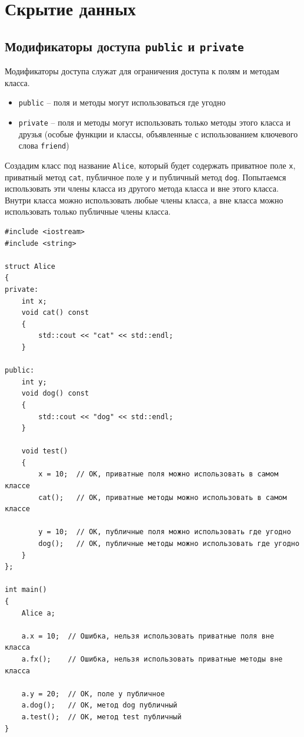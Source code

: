 \documentclass{article}
\begin{document}
\newpage


\section*{Скрытие данных}
\subsection*{Модификаторы доступа \texttt{public} и \texttt{private}}
Модификаторы доступа служат для ограничения доступа к полям и методам класса.
\begin{itemize}
\item \texttt{public} -- поля и методы могут использоваться где угодно
\item \texttt{private} -- поля и методы могут использовать только методы этого класса и друзья (особые функции и классы, объявленные с использованием ключевого слова \texttt{friend})
\end{itemize}
Создадим класс под название \texttt{Alice}, который будет содержать приватное поле \texttt{x}, приватный метод \texttt{cat}, публичное поле \texttt{y} и публичный метод \texttt{dog}. Попытаемся использовать эти члены класса из другого метода класса и вне этого класса. Внутри класса можно использовать любые члены класса, а вне класса можно использовать только публичные члены класса.
\begin{lstlisting}
#include <iostream>
#include <string>

struct Alice 
{
private:
    int x;
    void cat() const 
    {
    	std::cout << "cat" << std::endl;
    }
    
public:
	int y;
	void dog() const 
	{
		std::cout << "dog" << std::endl;
	}
	
	void test()
	{
		x = 10;  // OK, приватные поля можно использовать в самом классе
		cat();   // OK, приватные методы можно использовать в самом классе
		
		y = 10;  // OK, публичные поля можно использовать где угодно
		dog();   // OK, публичные методы можно использовать где угодно
	}
};

int main() 
{
    Alice a;
    
    a.x = 10;  // Ошибка, нельзя использовать приватные поля вне класса
    a.fx();    // Ошибка, нельзя использовать приватные методы вне класса
    
    a.y = 20;  // OK, поле y публичное
    a.dog();   // OK, метод dog публичный
    a.test();  // ОК, метод test публичный
}
\end{lstlisting}
\end{document}
